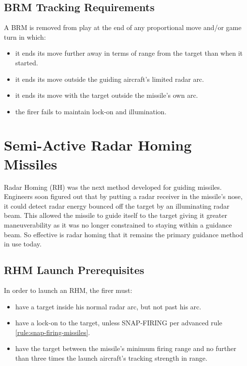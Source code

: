 \subsection{BRM Tracking Requirements} A BRM is removed from play at the end of any proportional move and/or game turn in which:

\begin{itemize}

    \item it ends its move further away in terms of range from the target than when it started.

    \item it ends its move outside the guiding aircraft's limited radar arc.

    \item it ends its move with the target outside the missile's own  arc.

    \item the firer fails to maintain lock-on and illumination.

\end{itemize}

\section{Semi-Active Radar Homing Missiles}
\label{rule:semi-active-radar-homing-missiles}

Radar Homing (RH) was the next method developed for guiding missiles. Engineers soon figured out that by putting a radar receiver in the missile's nose, it could detect radar energy bounced off the target by an illuminating radar beam. This allowed the missile to guide itself to the target giving it greater maneuverability as it was no longer constrained to staying within a guidance beam. So effective is radar homing that it remains the primary guidance method in use today.

\subsection{RHM Launch Prerequisites} In order to launch an RHM, the firer must:

\begin{itemize}

    \item have a target inside his normal radar arc, but not past his  arc.

    \item have a lock-on to the target, unless SNAP-FIRING per advanced rule \ref{rule:snap-firing-missiles}.

    \item have the target between the missile's minimum firing range and no further than three times the launch aircraft's tracking strength in range.

\end{itemize}

